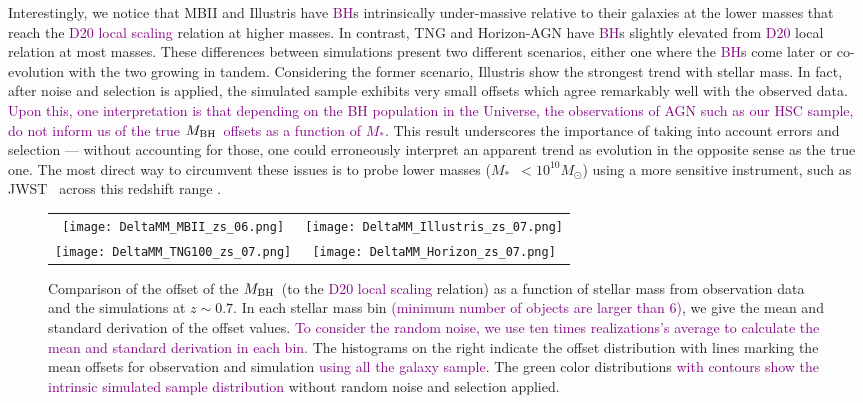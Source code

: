 \documentclass[twocolumn]{aastex631}
\newcommand{\todo}[1]{\textcolor{red}{[{\bf TODO}: #1]}}
\newcommand{\red}[1]{\textcolor{purple}{#1}}
\def\smass{{$M_*$}}
\def\mbh{$M_{\rm BH}$}
\begin{document}
Interestingly, we notice that MBII and Illustris have \red{BH}s intrinsically under-massive relative to their galaxies at the lower masses that reach the \red{D20 local scaling} relation at higher masses. In contrast, TNG and Horizon-AGN have \red{BH}s slightly elevated from \red{D20} local relation at most masses. These differences between simulations present two different scenarios, either one where the \red{BH}s come later or co-evolution with the two growing in tandem. Considering the former scenario, Illustris show the strongest trend with stellar mass. In fact, after noise and selection is applied, the simulated sample exhibits very small offsets which agree remarkably well with the observed data. \red{Upon this, one interpretation is that depending on the BH population in the Universe, the observations of AGN such as our HSC sample, do not inform us of the true \mbh\ offsets as a function of \smass.}  This result underscores the importance of taking into account errors and selection --- without accounting for those, one could erroneously interpret an apparent trend as evolution in the opposite sense as the true one. The most direct way to circumvent these issues is to probe lower masses (\smass\  $<10^{10}M_{\odot}$) using a more sensitive instrument, such as JWST~\citep{Habouzit2022} across this redshift range \citep[see also][]{2011MNRAS.417.2085V}.

\begin{figure*}
\centering
\begin{tabular}{c c}
\hspace*{-0.5cm} 
{\texttt{[image: DeltaMM\_MBII\_zs\_06.png]}}&
\hspace*{-0.3cm} 
{\texttt{[image: DeltaMM\_Illustris\_zs\_07.png]}}\\
\hspace*{-0.5cm} 
{\texttt{[image: DeltaMM\_TNG100\_zs\_07.png]}}&
\hspace*{-0.3cm} 
{\texttt{[image: DeltaMM\_Horizon\_zs\_07.png]}}\\
\end{tabular}
\caption{\label{fig:deltaMM} Comparison of the offset of the \mbh\ (to the \red{D20 local scaling} relation) as a function of stellar mass from observation data and the simulations at $z\sim0.7$. In each stellar mass bin \red{(minimum number of objects are larger than 6)}, we give the mean and standard derivation of the offset values. \red{To consider the random noise, we use ten times realizations's average to calculate the mean and standard derivation in each bin.} The histograms on the right indicate the offset distribution with lines marking the mean offsets for observation and simulation \red{using all the galaxy sample}. The green color distributions \red{with contours show the intrinsic simulated sample distribution} without random noise and selection applied.
}
\end{figure*} 
\end{document}
